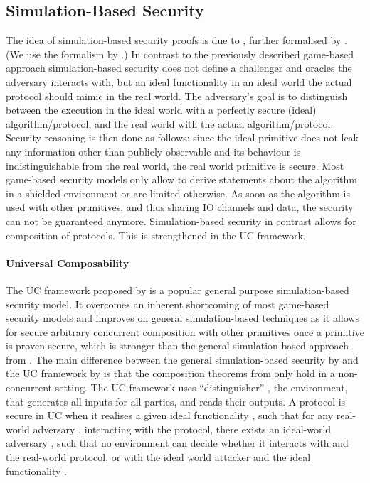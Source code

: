 \subsection{Simulation-Based Security}
The idea of simulation-based security proofs is due to \citet{Goldreich87}, further formalised by \citet{Canetti00}.
(We use the formalism by \citet{Goldreich2001,Goldreich2004}.)
In contrast to the previously described game-based approach simulation-based security does not define a challenger and oracles the adversary interacts with, but an ideal functionality in an ideal world the actual protocol should mimic in the real world.
The adversary's goal is to distinguish between the execution in the ideal world with a perfectly secure (ideal) algorithm/protocol, and the real world with the actual algorithm/protocol.
Security reasoning is then done as follows: since the ideal primitive does not leak any information other than publicly observable and its behaviour is indistinguishable from the real world, the real world primitive is secure.
Most game-based security models only allow to derive statements about the algorithm in a shielded environment or are limited otherwise.
As soon as the algorithm is used with other primitives, and thus sharing \ac{IO} channels and data, the security can not be guaranteed anymore.
Simulation-based security in contrast allows for composition of protocols.
This is strengthened in the \ac{UC} framework.

\paragraph{Universal Composability} \label{sec:uc-intro}
The \ac{UC} framework proposed by \citet{Canetti2001a} is a popular general purpose simulation-based security model.
It overcomes an inherent shortcoming of most game-based security models and improves on general simulation-based techniques as it allows for secure arbitrary concurrent composition with other primitives once a primitive is proven secure, which is stronger than the general simulation-based approach from \citet{Canetti00}.
The main difference between the general simulation-based security by \citet{Canetti00} and the \ac{UC} framework by \citet{Canetti2001a} is that the composition theorems from \citet{Canetti00} only hold in a non-concurrent setting.
The \ac{UC} framework uses ``distinguisher'' \UCZ, the environment, that generates all inputs for all parties, and reads their outputs.
A protocol is secure in \ac{UC} when it realises a given ideal functionality \UCF, such that for any real-world adversary \A, interacting with the protocol, there exists an ideal-world adversary \UCS, such that no environment \UCZ can decide whether it interacts with \A and the real-world protocol, or with the ideal world attacker \SIM and the ideal functionality \UCF.


